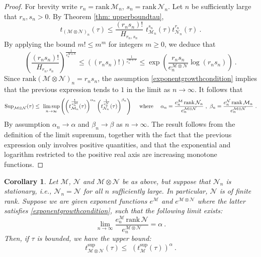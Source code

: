 \documentclass[a4paper,10pt]{amsart}
\newtheorem{cor}[thm]{Corollary}
\theoremstyle{definition}
\theoremstyle{remark}
\numberwithin{equation}{section}
\newcommand{\ts}{\mathrm{Sup}}
\newcommand{\rank}{\mathrm{rank}}
\newcommand{\0}{\color{blue}{\mathsf{0}}}
\begin{document}
  \begin{proof} For brevity write $r_n=\rank \, \mathcal{M}_n$, $s_n=  \rank \, \mathcal{N}_n$. Let $n$ be sufficiently large that $r_n,s_n>0$. 
  By Theorem \ref{thm: upperboundtau},
   \[ 
   t_{(\mathcal{M} \otimes \mathcal{N})_n} (\tau )  \leq   \frac{ (  r_n s_n  )!}{H_{r_n,s_n}} \, \,   t^{s_n}_{\mathcal{M}_n}(\tau)     t^{r_n}_{\mathcal{N}_n}(\tau)    \  .  
  \]
 By applying the bound $m! \leq m^m$ for integers $m\geq 0$, we deduce that
\[  \left( \frac{ (  r_n s_n  )!}{H_{r_n,s_n}}\right)^{\frac{1}{e_n^{\mathcal{M}\otimes\mathcal{N}}}} \leq     ((  r_n s_n  )!)^{\frac{1}{e_n^{\mathcal{M}\otimes\mathcal{N}}}} \leq \exp \left( \frac{r_ns_n}{e_n^{\mathcal{M}\otimes\mathcal{N}}} \log(r_ns_n) \right) \ . \]
Since $\rank (\mathcal{M} \otimes \mathcal{N})_n = r_n s_n$,  the assumption  \eqref{exponentgrowthcondition} implies that the previous expression tends to $1$ in the limit as $n\rightarrow \infty$.
 It follows that 
  \[ 
   \ts_{\mathcal{M} \otimes \mathcal{N}} (\tau )  \leq     \, \, \limsup_{n\rightarrow \infty}    \left(   \left(t^{\frac{1}{e^{\mathcal{M}}_n}}_{\mathcal{M}_n}(\tau) \right)^{\alpha_n}        \left(t^{\frac{1}{e^{\mathcal{N}}_n}}_{\mathcal{N}_n}(\tau) \right)^{\beta_n} \right)    \quad \hbox{ where } \quad 
    \alpha_n =     \frac{e^{\mathcal{M}}_n \, \rank\, \mathcal{N}_n}{ e^{\mathcal{M}\otimes\mathcal{N}}_n} \ ,  \ \beta_n =  \frac{e^{\mathcal{N}}_n \, \rank\, \mathcal{M}_n}{ e^{\mathcal{M}\otimes\mathcal{N}}_n}  \ . \]
 By assumption $\alpha_n \rightarrow \alpha$ and $\beta_n\rightarrow \beta$ as $n\rightarrow \infty$.   The result follows from the definition of the limit supremum, together with  the fact that  the previous expression only involves positive quantities,  and that  the exponential and logarithm restricted to the positive real axis are   increasing monotone functions. 
  \end{proof} 
  \begin{cor}  \label{cor: stationarytp} Let $\mathcal{M}$, $\mathcal{N}$ and $\mathcal{M} \otimes \mathcal{N}$ be as above, but  suppose that $\mathcal{N}_n $ is stationary, i.e., $\mathcal{N}_n = \mathcal{N}$ for all $n$ sufficiently large. In particular, $\mathcal{N}$ is of finite rank. Suppose we are given exponent functions $e^{\mathcal{M}}$ and $e^{\mathcal{M} \otimes \mathcal{N}}$
  where the latter satisfies \eqref{exponentgrowthcondition}, such that the following limit exists:
  \[   \lim_{n \rightarrow \infty}  \frac{e^{\mathcal{M}}_n \, \rank\, \mathcal{N}}{ e^{\mathcal{M}\otimes\mathcal{N}}_n} =\alpha\ .   \] 
    Then,  if $\tau$ is bounded,  we have the upper bound:
   \[   t^{\sup}_{\mathcal{M} \otimes \mathcal{N}} (\tau )  \leq     \, \,   \left(t^{\sup}_{\mathcal{M}}(\tau) \right)^{\alpha}    \  .  
  \]
  \end{cor} 
  
\end{document}
